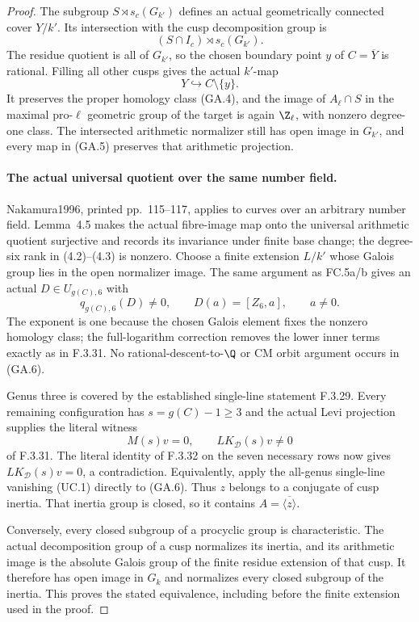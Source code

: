 \begin{proof}
The subgroup $S\rtimes s_c(G_{k'})$ defines an
actual geometrically connected cover $Y/k'$.
Its intersection with the cusp decomposition
group is
\[
                (S\cap I_c)\rtimes s_c(G_{k'}).
\]
The residue quotient is all of $G_{k'}$, so the
chosen boundary point $y$ of $C=\overline Y$
is rational. Filling all other cusps gives the
actual $k'$-map
\[
                        Y\hookrightarrow C\setminus\{y\}.
                                                               \tag{GA.5}
\]
It preserves the proper homology class (GA.4),
and the image of $A_\ell\cap S$ in the maximal
pro-$\ell$ geometric group of the target is
again $\Z_\ell$, with nonzero degree-one class.
The intersected arithmetic normalizer still
has open image in $G_{k'}$, and every map in
(GA.5) preserves that arithmetic projection.

\paragraph{The actual universal quotient over the same number field.}
Nakamura1996, printed pp.~115--117\cite{AuditNakamura1996}, applies to
curves over an arbitrary number field. Lemma~4.5
makes the actual fibre-image map onto the
universal arithmetic quotient surjective and
records its invariance under finite base
change; the degree-six rank in (4.2)--(4.3)
is nonzero. Choose a finite extension $L/k'$
whose Galois group lies in the open normalizer
image. The same argument as FC.5a/b gives an
actual $D\in U_{g(C),6}$ with
\[
              q_{g(C),6}(D)\ne0,
              \qquad D(a)=[Z_6,a],\qquad a\ne0.           \tag{GA.6}
\]
The exponent is one because the chosen Galois
element fixes the nonzero homology class;
the full-logarithm correction removes the
lower inner terms exactly as in F.3.31.
No rational-descent-to-$\Q$ or CM orbit
argument occurs in (GA.6).

Genus three is covered by the established
single-line statement F.3.29. Every remaining
configuration has $s=g(C)-1\geq3$ and the
actual Levi projection supplies the literal
witness
\[
             M(s)v=0,\qquad LK_{\mathcal D}(s)v\ne0        \tag{GA.7}
\]
of F.3.31. The literal identity of F.3.32 on the seven necessary rows
now gives $LK_{\mathcal D}(s)v=0$, a contradiction. Equivalently,
apply the all-genus single-line vanishing (UC.1) directly to (GA.6).
Thus $z$ belongs to a conjugate of cusp inertia. That inertia group
is closed, so it contains $A=\overline{\langle z\rangle}$.

Conversely, every closed subgroup of a procyclic group is
characteristic. The actual decomposition group of a cusp normalizes
its inertia, and its arithmetic image is the absolute Galois group
of the finite residue extension of that cusp. It therefore has
open image in $G_k$ and normalizes every closed subgroup of the
inertia. This proves the stated equivalence, including before the
finite extension used in the proof.


\end{proof}
